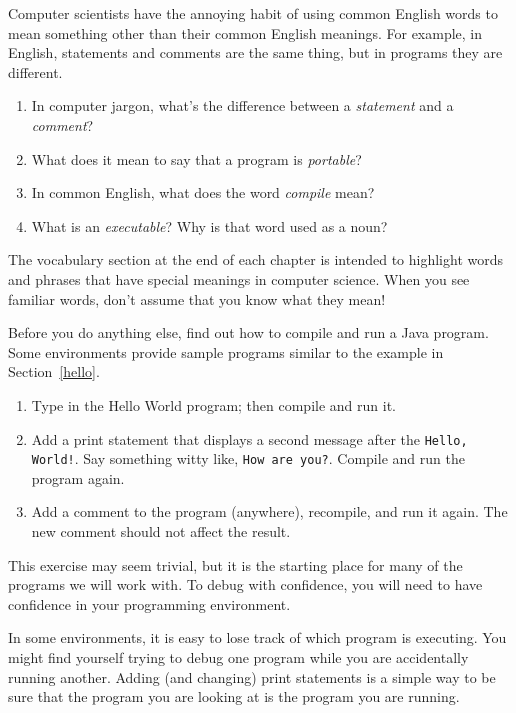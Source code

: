 \begin{exercise}  %

Computer scientists have the annoying habit of using common English words to mean something other than their common English meanings.
For example, in English, statements and comments are the same thing, but in programs they are different.

\begin{enumerate}
\item In computer jargon, what's the difference between a {\em statement} and a {\em comment}?
\item What does it mean to say that a program is {\em portable}?
\item In common English, what does the word {\em compile} mean?
\item What is an {\em executable}? Why is that word used as a noun?
\end{enumerate}

The vocabulary section at the end of each chapter is intended to highlight words and phrases that have special meanings in computer science.
When you see familiar words, don't assume that you know what they mean!

\end{exercise}


\begin{exercise}  %

Before you do anything else, find out how to compile and run a Java program.
Some environments provide sample programs similar to the example in Section~\ref{hello}.

\begin{enumerate}
\item Type in the Hello World program; then compile and run it.

\item Add a print statement that displays a second message after the {\tt Hello, World!}.
Say something witty like, {\tt How are you?}.
Compile and run the program again.

\item Add a comment to the program (anywhere), recompile, and run it again.
The new comment should not affect the result.
\end{enumerate}

This exercise may seem trivial, but it is the starting place for many of the programs we will work with.
To debug with confidence, you will need to have confidence in your programming environment.

In some environments, it is easy to lose track of which program is executing.
You might find yourself trying to debug one program while you are accidentally running another.
Adding (and changing) print statements is a simple way to be sure that the program you are looking at is the program you are running.

\end{exercise}


